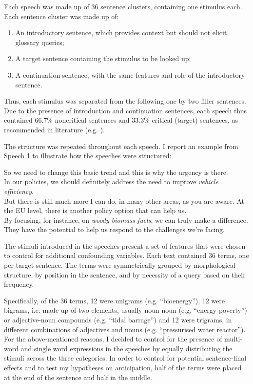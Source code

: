 Each speech was made up of 36 sentence clusters, containing one stimulus each. Each sentence cluster was made up of:

\begin{enumerate}
   \item An introductory sentence, which provides context but should not elicit glossary queries;
    \item A target sentence containing the stimulus to be looked up;
    \item A continuation sentence, with the same features and role of the introductory sentence.
\end{enumerate}
Thus, each stimulus was separated from the following one by two filler sentences. Due to the presence of introduction and continuation sentences, each speech thus contained 66.7\% noncritical sentences and 33.3\% critical (target) sentences, as recommended in literature (e.g. \citealt[17]{keating_experimental_2015}).

The structure was repeated throughout each speech. I report an example from Speech 1 to illustrate how the speeches were structured:

\ea So we need to change this basic trend and this is why the urgency is there.\\
    In our policies, we should definitely address the need to improve \textit{vehicle efficiency}.\\
    But there is still much more I can do, in many other areas, as you are aware.
\ex At the EU level, there is another policy option that can help us.\\
    By focusing, for instance, on \textit{woody biomass fuels}, we can truly make a difference.\\
    They have the potential to help us respond to the challenges we're facing.
\z

The stimuli introduced in the speeches present a set of features that were chosen to control for additional confounding variables. Each text contained 36 terms, one per target sentence. The terms were symmetrically grouped by morphological structure, by position in the sentence, and by necessity of a query based on their frequency.

Specifically, of the 36 terms, 12 were unigrams (e.g. ``bioenergy''), 12 were bigrams, i.e. made up of two elements, usually noun-noun (e.g. ``energy poverty'') or adjective-noun compounds (e.g. ``tidal barrage'') and 12 were trigrams, in different combinations of adjectives and nouns (e.g. ``pressurised water reactor''). For the above-mentioned reasons, I decided to control for the presence of multi-word and single word expressions in the speeches by equally distributing the stimuli across the three categories. In order to control for potential sentence-final effects and to test my hypotheses on anticipation, half of the terms were placed at the end of the sentence and half in the middle.


